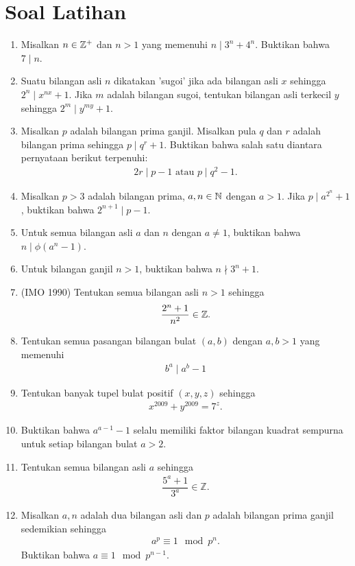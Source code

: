 \documentclass[11pt]{scrartcl}
\begin{document}
\section{Soal Latihan}
\begin{enumerate}
    \item Misalkan $n \in \mathbb Z^+$ dan $n > 1$ yang memenuhi $n \mid 3^n + 4^n$. Buktikan bahwa $7 \mid n$.
    \item Suatu bilangan asli $n$ dikatakan 'sugoi' jika ada bilangan asli $x$ sehingga $2^n \mid x^{nx}+1$. Jika $m$ adalah bilangan sugoi, tentukan bilangan asli terkecil $y$ sehingga $2^m \mid y^{my}+1$.
    \item Misalkan $p$ adalah bilangan prima ganjil. Misalkan pula $q$ dan $r$ adalah bilangan prima sehingga $p \mid q^r+1$. Buktikan bahwa salah satu diantara pernyataan berikut terpenuhi: 
    \begin{align*}
        2r \mid p-1 \text{ atau } p \mid q^2-1.
    \end{align*}
    \item Misalkan $p>3$ adalah bilangan prima, $a,n \in \mathbb N$ dengan $a > 1$. Jika $p \mid a^{2^n}+1$, buktikan bahwa $2^{n+1} \mid p-1$.
    \item Untuk semua bilangan asli $a$ dan $n$ dengan $a \neq 1$, buktikan bahwa $n \mid \phi(a^n-1)$.
    \item Untuk bilangan ganjil $n > 1$, buktikan bahwa $n \nmid 3^n+1$.
    \item (IMO 1990) Tentukan semua bilangan asli $n > 1$ sehingga 
    \begin{align*}
        \dfrac{2^n+1}{n^2} \in \mathbb Z.
    \end{align*}
    \item Tentukan semua pasangan bilangan bulat $(a,b)$ dengan $a,b > 1$ yang memenuhi 
    \begin{align*}
        b^a \mid a^b -1
    \end{align*}
    \item Tentukan banyak tupel bulat positif $(x,y,z)$ sehingga
    \begin{align*}
        x^{2009}+y^{2009} = 7^z.
    \end{align*}
    \item Buktikan bahwa $a^{a-1}-1$ selalu memiliki faktor bilangan kuadrat sempurna untuk setiap bilangan bulat $a > 2$.
    \item Tentukan semua bilangan asli $a$ sehingga
    \begin{align*}
        \dfrac{5^a+1}{3^a} \in \mathbb{Z}.
    \end{align*}
    \item Misalkan $a,n$ adalah dua bilangan asli dan $p$ adalah bilangan prima ganjil sedemikian sehingga
    \begin{align*}
        a^p \equiv 1 \mod p^n.
    \end{align*}
    Buktikan bahwa $a \equiv 1 \mod p^{n-1}.$
\end{enumerate}
\end{document}
